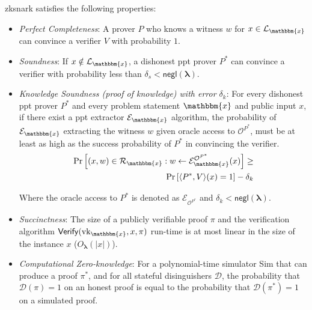 \begin{definition}
	\label{def:zkSNARK Properties}
	
	 \gls{zksnark} satisfies the following properties:
	
	\begin{itemize}
		\item \textit{Perfect Completeness}: A prover $P$ who knows a witness $w$ for $x\in \mathcal{L}_\mathbbm{x}$ can convince a verifier $V$ with probability $1$.
		
		\item \textit{Soundness}: If  $x \notin \mathcal{L}_\mathbbm{x}$, a dishonest \gls{ppt} prover $P^*$ can convince a verifier with probability less than $\delta_s < \mathsf{negl}(\boldsymbol{\lambda})$.
		
		\item \textit{Knowledge Soundness (proof of knowledge) with error $\delta_k$}: For every dishonest \gls{ppt} prover $P^*$ and every problem statement $\mathbbm{x}$ and public input $x$, if there exist a \gls{ppt} extractor $\mathcal{E}_\mathbbm{x}$ algorithm, the probability of $\mathcal{E}_\mathbbm{x}$ extracting the witness $w$ given oracle access to $\mathcal{O}^{P^*}$, must be at least as high as the success probability of $P^*$ in convincing the verifier.
		\begin{align*}
			\Pr\left[(x, w) \in \mathcal{R}_\mathbbm{x}: w \leftarrow \mathcal{E}_\mathbbm{x}^{\mathcal{O}^{P^*}}(x)\right] \geq \\
			\Pr \left[ \langle P^*, V \rangle (x) = 1 \right] - \delta_k
		\end{align*}
		
		Where the oracle access to $P^*$ is denoted as $\mathcal{E}_{\mathcal{O}^{P^*}}$ and $\delta_k < \mathsf{negl}(\boldsymbol{\lambda})$.
		
		\item \textit{Succinctness}: The size of a publicly verifiable proof $\pi$  and the verification algorithm $\mathsf{Verify}(\text{vk}_\mathbbm{x}, x, \pi)$ run-time is at most linear in the size of the instance $x$ ($O_{\boldsymbol{\lambda}}(|x|)$).
	
		
		\item \textit{Computational Zero-knowledge}: For a polynomial-time simulator \textsf{Sim} that can produce a proof $\pi^*$, and for all stateful disinguishers $\mathcal{D}$, the probability  that $\mathcal{D}(\pi)=1$ on an honest proof is equal to the probability that $\mathcal{D}(\pi^*)=1$ on a simulated proof.    
	\end{itemize}
	
\end{definition}

